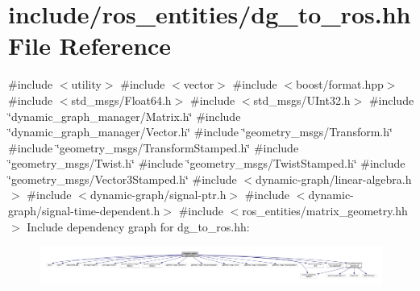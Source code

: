 \hypertarget{dg__to__ros_8hh}{}\section{include/ros\+\_\+entities/dg\+\_\+to\+\_\+ros.hh File Reference}
\label{dg__to__ros_8hh}
{\ttfamily \#include $<$utility$>$}\newline
{\ttfamily \#include $<$vector$>$}\newline
{\ttfamily \#include $<$boost/format.\+hpp$>$}\newline
{\ttfamily \#include $<$std\+\_\+msgs/\+Float64.\+h$>$}\newline
{\ttfamily \#include $<$std\+\_\+msgs/\+U\+Int32.\+h$>$}\newline
{\ttfamily \#include \char`\"{}dynamic\+\_\+graph\+\_\+manager/\+Matrix.\+h\char`\"{}}\newline
{\ttfamily \#include \char`\"{}dynamic\+\_\+graph\+\_\+manager/\+Vector.\+h\char`\"{}}\newline
{\ttfamily \#include \char`\"{}geometry\+\_\+msgs/\+Transform.\+h\char`\"{}}\newline
{\ttfamily \#include \char`\"{}geometry\+\_\+msgs/\+Transform\+Stamped.\+h\char`\"{}}\newline
{\ttfamily \#include \char`\"{}geometry\+\_\+msgs/\+Twist.\+h\char`\"{}}\newline
{\ttfamily \#include \char`\"{}geometry\+\_\+msgs/\+Twist\+Stamped.\+h\char`\"{}}\newline
{\ttfamily \#include \char`\"{}geometry\+\_\+msgs/\+Vector3\+Stamped.\+h\char`\"{}}\newline
{\ttfamily \#include $<$dynamic-\/graph/linear-\/algebra.\+h$>$}\newline
{\ttfamily \#include $<$dynamic-\/graph/signal-\/ptr.\+h$>$}\newline
{\ttfamily \#include $<$dynamic-\/graph/signal-\/time-\/dependent.\+h$>$}\newline
{\ttfamily \#include $<$ros\+\_\+entities/matrix\+\_\+geometry.\+hh$>$}\newline
Include dependency graph for dg\+\_\+to\+\_\+ros.\+hh\+:
\nopagebreak
\begin{figure}[H]
\begin{center}
\leavevmode
\includegraphics[width=350pt]{dg__to__ros_8hh__incl}
\end{center}
\end{figure}

